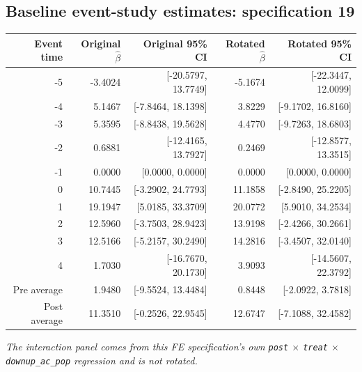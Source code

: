 \documentclass[10pt]{article}
\begin{document}
\subsection*{Baseline event-study estimates: specification 19}
\begin{center}
\scriptsize
\begin{tabular}{r rr rr}
\toprule
Event time & Original $\hat\beta$ & Original 95\% CI & Rotated $\hat\beta$ & Rotated 95\% CI \\
\midrule
-5 & -3.4024 & [-20.5797, 13.7749] & -5.1674 & [-22.3447, 12.0099] \\
-4 & 5.1467 & [-7.8464, 18.1398] & 3.8229 & [-9.1702, 16.8160] \\
-3 & 5.3595 & [-8.8438, 19.5628] & 4.4770 & [-9.7263, 18.6803] \\
-2 & 0.6881 & [-12.4165, 13.7927] & 0.2469 & [-12.8577, 13.3515] \\
-1 & 0.0000 & [0.0000, 0.0000] & 0.0000 & [0.0000, 0.0000] \\
0 & 10.7445 & [-3.2902, 24.7793] & 11.1858 & [-2.8490, 25.2205] \\
1 & 19.1947 & [5.0185, 33.3709] & 20.0772 & [5.9010, 34.2534] \\
2 & 12.5960 & [-3.7503, 28.9423] & 13.9198 & [-2.4266, 30.2661] \\
3 & 12.5166 & [-5.2157, 30.2490] & 14.2816 & [-3.4507, 32.0140] \\
4 & 1.7030 & [-16.7670, 20.1730] & 3.9093 & [-14.5607, 22.3792] \\
\midrule
Pre average & 1.9480 & [-9.5524, 13.4484] & 0.8448 & [-2.0922, 3.7818] \\
Post average & 11.3510 & [-0.2526, 22.9545] & 12.6747 & [-7.1088, 32.4582] \\
\bottomrule
\end{tabular}
\end{center}
\medskip
\textit{The interaction panel comes from this FE specification's own \texttt{post} $\times$ \texttt{treat} $\times$ \texttt{downup\_ac\_pop} regression and is not rotated.}
\clearpage
\end{document}
